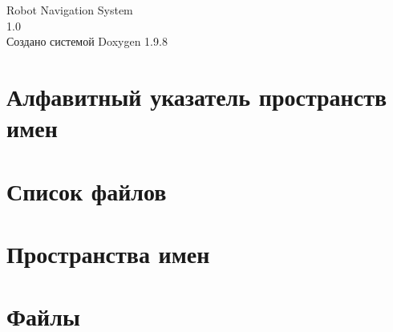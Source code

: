 \documentclass[twoside]{book}
\newcommand{\+}{\discretionary{\mbox{\scriptsize$\hookleftarrow$}}{}{}}
\newcommand{\clearemptydoublepage}{%
    \newpage{\pagestyle{empty}\cleardoublepage}%
  }
\begin{document}
  \raggedbottom
    \hypersetup{pageanchor=false,
                bookmarksnumbered=true,
                pdfencoding=unicode
               }
  \begin{titlepage}
  \vspace*{7cm}
  \begin{center}%
  {\Large Robot Navigation System}\\
  [1ex]\large 1.\+0 \\
  \vspace*{1cm}
  {\large Создано системой Doxygen 1.9.8}\\
  \end{center}
  \end{titlepage}
  \clearemptydoublepage
  \tableofcontents
  \clearemptydoublepage
  \hypersetup{pageanchor=true}


\chapter{Алфавитный указатель пространств имен}

\chapter{Список файлов}

\chapter{Пространства имен}

\chapter{Файлы}



  \backmatter
  \newpage
  \clearemptydoublepage
  \printindex
\end{document}
